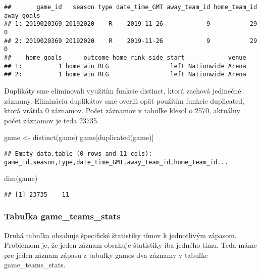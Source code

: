 \documentclass[
]{article}
\newenvironment{Shaded}{\begin{snugshade}}{\end{snugshade}}
\newcommand{\FunctionTok}[1]{\textcolor[rgb]{0.00,0.00,0.00}{#1}}
\newcommand{\NormalTok}[1]{#1}
\newcommand{\OtherTok}[1]{\textcolor[rgb]{0.56,0.35,0.01}{#1}}
\begin{document}
\begin{verbatim}
##       game_id   season type date_time_GMT away_team_id home_team_id away_goals
## 1: 2019020369 20192020    R    2019-11-26            9           29          0
## 2: 2019020369 20192020    R    2019-11-26            9           29          0
##    home_goals      outcome home_rink_side_start            venue
## 1:          1 home win REG                 left Nationwide Arena
## 2:          1 home win REG                 left Nationwide Arena
\end{verbatim}

Duplikáty sme eliminovali využitím funkcie distinct, ktorá zachová
jedinečné záznamy. Elimináciu duplikátov sme overili opäť použitím
funkcie duplicated, ktorá vrátila 0 záznamov. Počet záznamov v tabuľke
klesol o 2570, aktuálny počet záznamov je teda 23735.

\begin{Shaded}
\begin{Highlighting}[]
\NormalTok{game }\OtherTok{\textless{}{-}} \FunctionTok{distinct}\NormalTok{(game)}
\NormalTok{game[}\FunctionTok{duplicated}\NormalTok{(game)]}
\end{Highlighting}
\end{Shaded}

\begin{verbatim}
## Empty data.table (0 rows and 11 cols): game_id,season,type,date_time_GMT,away_team_id,home_team_id...
\end{verbatim}

\begin{Shaded}
\begin{Highlighting}[]
\FunctionTok{dim}\NormalTok{(game)}
\end{Highlighting}
\end{Shaded}

\begin{verbatim}
## [1] 23735    11
\end{verbatim}

\hypertarget{tabuux13eka-game_teams_stats}{%
\subsubsection{Tabuľka
game\_teams\_stats}\label{tabuux13eka-game_teams_stats}}

Druhá tabuľka obsahuje špecifické štatistiky tímov k jednotlivým
zápasom. Problémom je, že jeden záznam obsahuje štatistiky iba jedného
tímu. Teda máme pre jeden záznam zápasu z tabuľky games dva záznamy v
tabuľke game\_teams\_stats.
\end{document}
